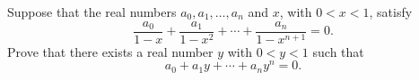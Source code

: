 Suppose that the real numbers $a_0, a_1, \dots, a_n$ and
$x$, with $0 < x < 1$, satisfy
\[
\frac{a_0}{1-x} + \frac{a_1}{1-x^2} + \cdots + \frac{a_n}{1 - x^{n+1}} = 0.
\]
Prove that there exists a real number $y$ with $0 < y < 1$ such that
\[
a_0 + a_1 y + \cdots + a_n y^n = 0.
\]
